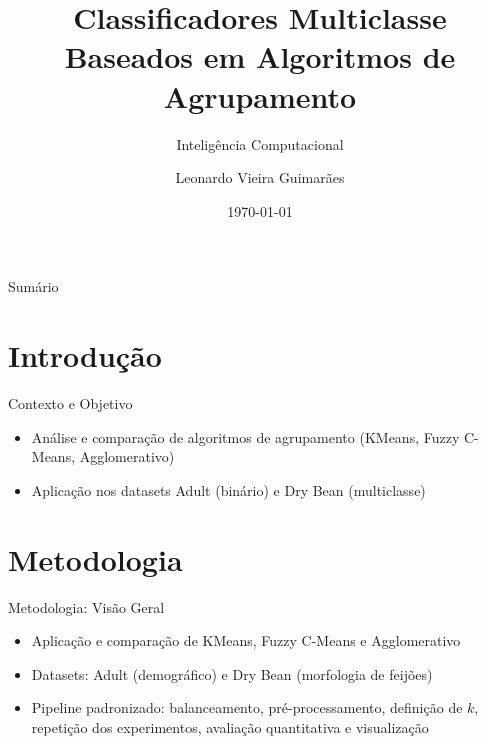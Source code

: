 \documentclass[aspectratio=169]{beamer}
\title{Classificadores Multiclasse Baseados em Algoritmos de Agrupamento}
\subtitle{Inteligência Computacional}
\author{Leonardo Vieira Guimar\~aes}
\institute{Mestrado em Modelagem Computacional e Sistemas\\CEFET-MG}
\date{\today}
\begin{document}
\begin{frame}
\titlepage
\end{frame}


\begin{frame}{Sumário}
\tableofcontents
\end{frame}

\section{Introdução}

\begin{frame}{Contexto e Objetivo}
\begin{itemize}
    \item Análise e comparação de algoritmos de agrupamento (KMeans, Fuzzy C-Means, Agglomerativo)
    \item Aplicação nos datasets Adult (binário) e Dry Bean (multiclasse)
  
\end{itemize}
\end{frame}

\section{Metodologia}

\begin{frame}{Metodologia: Visão Geral}
\begin{itemize}
    \item Aplicação e comparação de KMeans, Fuzzy C-Means e Agglomerativo
    \item Datasets: Adult (demográfico) e Dry Bean (morfologia de feijões)
    \item Pipeline padronizado: balanceamento, pré-processamento, definição de $k$, repetição dos experimentos, avaliação quantitativa e visualização
\end{itemize}
\end{frame}

\end{document}
